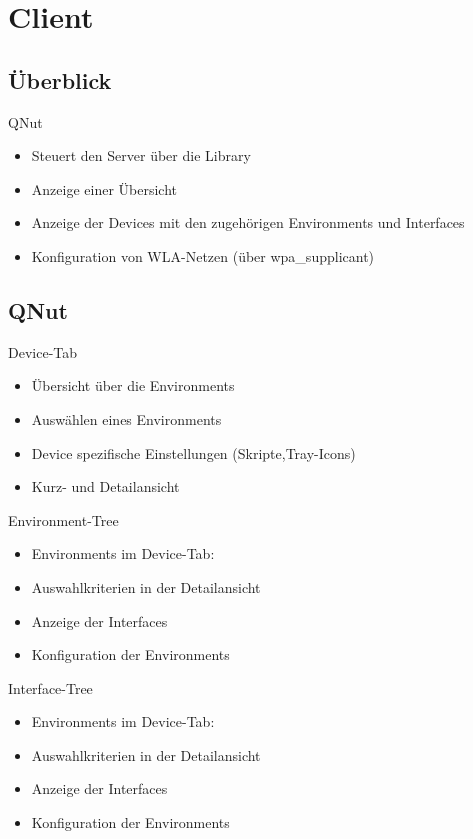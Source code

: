 
\section{Client}
\subsection{Überblick}
\begin{frame}[<+-| alert@+>]{QNut}
	\begin{itemize}
		\item Steuert den Server über die Library
		\item Anzeige einer Übersicht
		\item Anzeige der Devices mit den zugehörigen Environments und Interfaces
		\item Konfiguration von WLA-Netzen (über wpa\_supplicant)
	\end{itemize}
\end{frame}

\subsection{QNut}
\begin{frame}[<+-| alert@+>]{Device-Tab}
	\begin{itemize}
		\item Übersicht über die Environments
		\item Auswählen eines Environments
		\item Device spezifische Einstellungen (Skripte,Tray-Icons)
		\item Kurz- und Detailansicht
	\end{itemize}
\end{frame}

\begin{frame}[<+-| alert@+>]{Environment-Tree}
	\begin{itemize}
		\item Environments im Device-Tab:
		\item Auswahlkriterien in der Detailansicht
		\item Anzeige der Interfaces
		\item Konfiguration der Environments
	\end{itemize}
\end{frame}

\begin{frame}[<+-| alert@+>]{Interface-Tree}
	\begin{itemize}
		\item Environments im Device-Tab:
		\item Auswahlkriterien in der Detailansicht
		\item Anzeige der Interfaces
		\item Konfiguration der Environments
	\end{itemize}
\end{frame}
